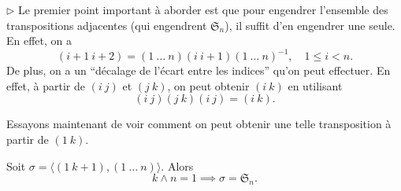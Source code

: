 \documentclass[french,a4paper,10pt]{article}
\begin{document}
    \(\triangleright\) Le premier point important à aborder est que
    pour engendrer l'ensemble des transpositions adjacentes (qui engendrent \(\mathfrak S_n\)), il suffit
    d'en engendrer une seule. En effet, on a
    \begin{equation*}
        (i+1~i+2) = (1~\ldots~n) (i~i+1) {(1~\ldots~n)}^{-1},\quad 1 \leq i < n.
    \end{equation*}
    De plus, on a un ``décalage de l'écart entre les indices'' qu'on peut effectuer. En effet, 
    à partir de \( (i~j) \) et \( (j~k) \), on peut obtenir \( (i~k) \) en utilisant
    \begin{equation*}
        (i~j) (j~k) (i~j) = (i~k).
    \end{equation*}

    Essayons maintenant de voir comment on peut obtenir une telle transposition à partir de \( (1~k) \).

    \begin{lemma}
        Soit \( \sigma = \langle (1~k+1), (1~\ldots~n) \rangle \). Alors
        \begin{equation*}
            k\wedge n = 1 \implies \sigma = \mathfrak S_n.
        \end{equation*}
    \end{lemma}
\end{document}
